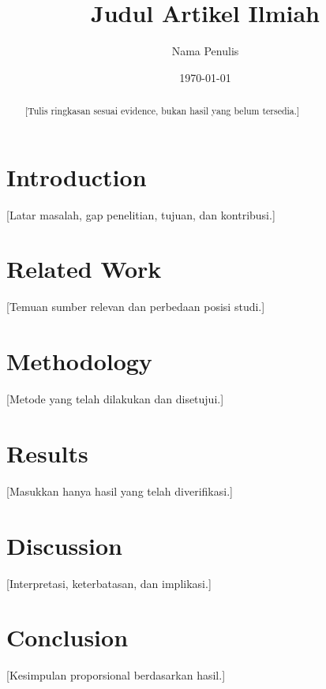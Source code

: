 \documentclass[11pt,a4paper]{article}
\title{Judul Artikel Ilmiah}
\author{Nama Penulis}
\date{\today}
\begin{document}
\maketitle
\begin{abstract}
[Tulis ringkasan sesuai evidence, bukan hasil yang belum tersedia.]
\end{abstract}

\section{Introduction}
[Latar masalah, gap penelitian, tujuan, dan kontribusi.]

\section{Related Work}
[Temuan sumber relevan dan perbedaan posisi studi.]

\section{Methodology}
[Metode yang telah dilakukan dan disetujui.]

\section{Results}
[Masukkan hanya hasil yang telah diverifikasi.]

\section{Discussion}
[Interpretasi, keterbatasan, dan implikasi.]

\section{Conclusion}
[Kesimpulan proporsional berdasarkan hasil.]

\nocite{lamport1994latex}


\end{document}
